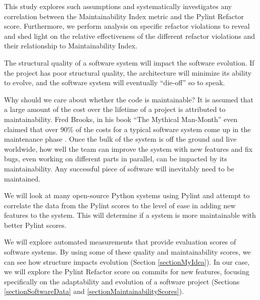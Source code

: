 This study explores such assumptions and systematically investigates any correlation between the Maintainability Index metric and the Pylint Refactor score. Furthermore, we perform analysis on specific refactor violations to reveal and shed light on the relative effectiveness of the different refactor violations and their relationship to Maintainability Index.

The structural quality of a software system will impact the software evolution. If the project has poor structural quality, the architecture will minimize its ability to evolve, and the software system will eventually ``die-off'' so to speak.

Why should we care about whether the code is maintainable? It is assumed that a large amount of the cost over the lifetime of a project is attributed to maintainability. Fred Brooks, in his book ``The Mythical Man-Month'' even claimed that over 90\% of the costs for a typical software system come up in the maintenance phase \cite{brooks:mythical}. Once the bulk of the system is off the ground and live worldwide, how well the team can improve the system with new features and fix bugs, even working on different parts in parallel, can be impacted by its maintainability. Any successful piece of software will inevitably need to be maintained.

We will look at many open-source Python systems using Pylint and attempt to correlate the data from the Pylint scores to the level of ease in adding new features to the system. This will determine if a system is more maintainable with better Pylint scores. 



We will explore automated measurements that provide evaluation scores of software systems. By using some of these quality and maintainability scores, we can see how structure impacts evolution (Section \ref{sectionMyIdea}). In our case, we will explore the Pylint Refactor score on commits for new features, focusing specifically on the adaptability and evolution of a software project (Sections \ref{sectionSoftwareData} and \ref{sectionMaintainabilityScores}).

